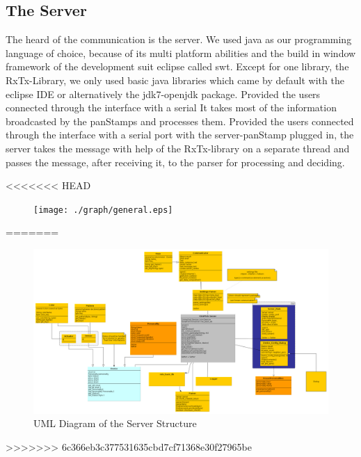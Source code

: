 \subsection{The Server}
The heard of the communication is the server. We used java\cite{java} as our programming language of choice, because of its multi platform abilities and the build in window framework of the development suit eclipse\cite{eclipse} called swt\cite{swt}. Except for one library, the RxTx-Library\cite{rxtx}, we only used basic java libraries which came by default with the eclipse IDE\cite{ide}  or alternatively the jdk7-openjdk\cite{open_jdk} package.
Provided the users connected through the interface with a serial It takes most of the information broadcasted by the panStamps\cite{panstamp} and processes them.
Provided the users connected through the interface with a serial port with the server-panStamp plugged in, the server takes the message with help of the RxTx-library\cite{rxtx} on a separate thread and passes the message, after receiving it, to the parser for processing and deciding.

<<<<<<< HEAD
\begin{figure}[ht]
\centering
\texttt{[image: ./graph/general.eps]}
\end{figure}
=======
\begin{figure}[ht]
	\centerline{\includegraphics[width=\textwidth]{./graph/general.png}}
	\caption{UML Diagram of the Server Structure}
	\label{fig:server_uml}
\end{figure}
	

>>>>>>> 6c366eb3c377531635cbd7cf71368e30f27965be

